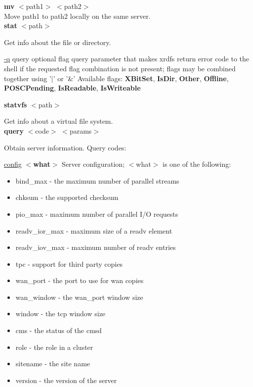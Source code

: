 \documentclass{article}
\begin{document}
        \noindent \textbf{mv} $<$path1$>$ $<$path2$>$ \\
        Move path1 to path2 locally on the same server. \\

        \noindent \textbf{stat} $<$path$>$
        
        \noindent Get info about the file or directory.

		\begin{minipage}{\dimexpr\textwidth-\parindent}
        \noindent \underline{-q} query optional flag query parameter that makes xrdfs return error code to the shell if the requested flag combination is not present; flags may be combined together using '$\vert$' or '\&'
        Available flags: \textbf{XBitSet}, \textbf{IsDir}, \textbf{Other}, \textbf{Offline}, \textbf{POSCPending}, \textbf{IsReadable}, \textbf{IsWriteable} \\
        \end{minipage}

        \noindent \textbf{statvfs} $<$path$>$
        
        \noindent Get info about a virtual file system. \\

        \noindent \textbf{query} $<$code$>$ $<$params$>$
        
        \noindent Obtain server information. Query codes:
        
        \underline{config} \textbf{$<$what$>$} Server configuration; $<$what$>$ is one of the following:
		\begin{itemize}        
           \item bind_max      - the maximum number of parallel streams
           \item chksum        - the supported checksum
           \item pio_max       - maximum number of parallel I/O requests
           \item readv_ior_max - maximum size of a readv element
           \item readv_iov_max - maximum number of readv entries
           \item tpc           - support for third party copies
           \item wan_port      - the port to use for wan copies
           \item wan_window    - the wan_port window size
           \item window        - the tcp window size
           \item cms           - the status of the cmsd
           \item role          - the role in a cluster
           \item sitename      - the site name
           \item version       - the version of the server
        \end{itemize}      
               
\end{document}
